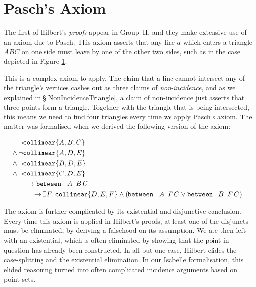 \section{Pasch's Axiom}
The first of Hilbert's \emph{proofs} appear in Group~II, and they make extensive use of an axiom due to Pasch. This axiom asserts that any line $a$ which enters a triangle $ABC$ on one side must leave by one of the other two sides, such as in the case depicted in Figure \ref{PaschDiagram}.

\begin{figure}\label{PaschDiagram}
\end{figure}

This is a complex axiom to apply. The claim that a line cannot intersect any of the triangle's vertices cashes out as three claims of \emph{non-incidence}, and as we explained in \S\ref{NonIncidenceTriangle}, a claim of non-incidence just asserts that three points form a triangle. Together with the triangle that is being intersected, this means we need to find four triangles every time we apply Pasch's axiom. The matter was formalised when we derived the following version of the axiom:

\begin{align*}
&\neg\texttt{collinear}\{A, B, C\}\\
\wedge\,&\neg\texttt{collinear}\{A, D, E\}\\
\wedge\,&\neg\texttt{collinear}\{B, D, E\}\\
\wedge\,&\neg\texttt{collinear}\{C, D, E\}\\
&\quad\rightarrow\texttt{between}\ \,\ A\ \,B\,C \\
&\qquad\rightarrow\exists F.\; \texttt{collinear} \{D, E, F\} \wedge (\texttt{between}\ \,\ A\ \,F\,C \vee \texttt{between}\ \,\ B\ \,F\,C).
\end{align*}

The axiom is further complicated by its existential and disjunctive conclusion. Every time this axiom is applied in Hilbert's proofs, at least one of the disjuncts must be eliminated, by deriving a falsehood on its assumption. We are then left with an existential, which is often eliminated by showing that the point in question has already been constructed. In all but one case, Hilbert elides the case-splitting and the existential elimination. In our Isabelle formalisation, this elided reasoning turned into often complicated incidence arguments based on point sets.

